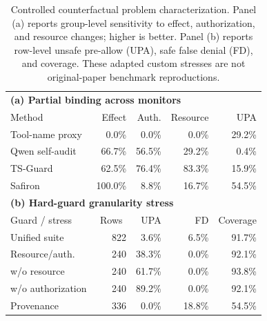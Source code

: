 \begin{table}[t]
\centering
\footnotesize
\setlength{\tabcolsep}{3.5pt}
\caption{Controlled counterfactual problem characterization. Panel (a) reports
group-level sensitivity to effect, authorization, and resource changes; higher
is better. Panel (b) reports row-level unsafe pre-allow (UPA), safe false denial
(FD), and coverage. These adapted custom stresses are not original-paper
benchmark reproductions.}
\label{tab:binding-problem-characterization}
\begin{tabular}{lrrrr}
\toprule
\multicolumn{5}{l}{\textbf{(a) Partial binding across monitors}} \\
Method & Effect & Auth. & Resource & UPA \\
\midrule
Tool-name proxy & 0.0\% & 0.0\% & 0.0\% & 29.2\% \\
Qwen self-audit & 66.7\% & 56.5\% & 29.2\% & 0.4\% \\
TS-Guard & 62.5\% & 76.4\% & 83.3\% & 15.9\% \\
Safiron & 100.0\% & 8.8\% & 16.7\% & 54.5\% \\
\midrule
\multicolumn{5}{l}{\textbf{(b) Hard-guard granularity stress}} \\
Guard / stress & \multicolumn{1}{c}{Rows} & UPA & FD & Coverage \\
\midrule
Unified suite & 822 & 3.6\% & 6.5\% & 91.7\% \\
Resource/auth. & 240 & 38.3\% & 0.0\% & 92.1\% \\
\quad w/o resource & 240 & 61.7\% & 0.0\% & 93.8\% \\
\quad w/o authorization & 240 & 89.2\% & 0.0\% & 92.1\% \\
Provenance & 336 & 0.0\% & 18.8\% & 54.5\% \\
\bottomrule
\end{tabular}
\end{table}
